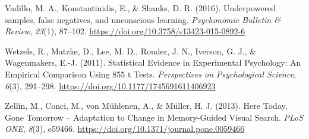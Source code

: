 \documentclass[
  man,
  floatsintext,
  longtable,
  nolmodern,
  notxfonts,
  notimes,
  colorlinks=true,linkcolor=blue,citecolor=blue,urlcolor=blue]{apa7}
\newlength{\cslhangindent}
\newenvironment{CSLReferences}[2] %
 {\begin{list}{}{%
  \setlength{\itemindent}{0pt}
  \setlength{\leftmargin}{0pt}
  \setlength{\parsep}{0pt}
  \ifodd #1
   \setlength{\leftmargin}{\cslhangindent}
   \setlength{\itemindent}{-1\cslhangindent}
  \fi
  \setlength{\itemsep}{#2\baselineskip}}}
 {\end{list}}
\begin{document}
\begin{CSLReferences}{1}{0}
Vadillo, M. A., Konstantinidis, E., \& Shanks, D. R. (2016).
Underpowered samples, false negatives, and unconscious learning.
\emph{Psychonomic Bulletin \& Review}, \emph{23}(1), 87--102.
\url{https://doi.org/10.3758/s13423-015-0892-6}

Wetzels, R., Matzke, D., Lee, M. D., Rouder, J. N., Iverson, G. J., \&
Wagenmakers, E.-J. (2011). Statistical {Evidence} in {Experimental
Psychology}: {An Empirical Comparison Using} 855 t {Tests}.
\emph{Perspectives on Psychological Science}, \emph{6}(3), 291--298.
\url{https://doi.org/10.1177/1745691611406923}

Zellin, M., Conci, M., von Mühlenen, A., \& Müller, H. J. (2013). Here
{Today}, {Gone Tomorrow} -- {Adaptation} to {Change} in {Memory-Guided
Visual Search}. \emph{PLoS ONE}, \emph{8}(3), e59466.
\url{https://doi.org/10.1371/journal.pone.0059466}

\end{CSLReferences}
\end{document}

